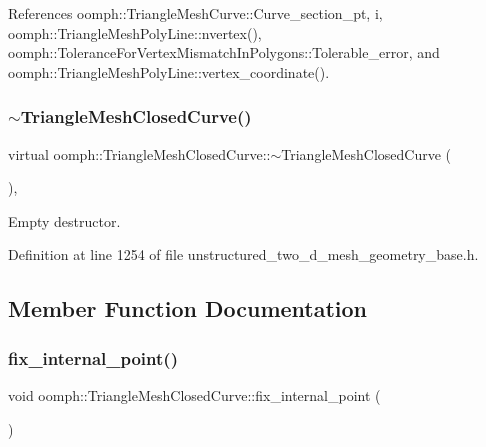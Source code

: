 References oomph\+::\+Triangle\+Mesh\+Curve\+::\+Curve\+\_\+section\+\_\+pt, i, oomph\+::\+Triangle\+Mesh\+Poly\+Line\+::nvertex(), oomph\+::\+Tolerance\+For\+Vertex\+Mismatch\+In\+Polygons\+::\+Tolerable\+\_\+error, and oomph\+::\+Triangle\+Mesh\+Poly\+Line\+::vertex\+\_\+coordinate().

\mbox{\label{classoomph_1_1TriangleMeshClosedCurve_adfdc8f86bd3cddd2c126acae7385a3af}} 
\subsubsection{\texorpdfstring{$\sim$\+Triangle\+Mesh\+Closed\+Curve()}{~TriangleMeshClosedCurve()}}
{\footnotesize\ttfamily virtual oomph\+::\+Triangle\+Mesh\+Closed\+Curve\+::$\sim$\+Triangle\+Mesh\+Closed\+Curve (\begin{DoxyParamCaption}{ }\end{DoxyParamCaption})\hspace{0.3cm}{\ttfamily [inline]}, {\ttfamily [virtual]}}



Empty destructor. 



Definition at line 1254 of file unstructured\+\_\+two\+\_\+d\+\_\+mesh\+\_\+geometry\+\_\+base.\+h.



\subsection{Member Function Documentation}
\mbox{\label{classoomph_1_1TriangleMeshClosedCurve_ac1fe434733d736fba44e580b35dadd10}} 
\subsubsection{\texorpdfstring{fix\+\_\+internal\+\_\+point()}{fix\_internal\_point()}}
{\footnotesize\ttfamily void oomph\+::\+Triangle\+Mesh\+Closed\+Curve\+::fix\+\_\+internal\+\_\+point (\begin{DoxyParamCaption}{ }\end{DoxyParamCaption})\hspace{0.3cm}{\ttfamily [inline]}}

